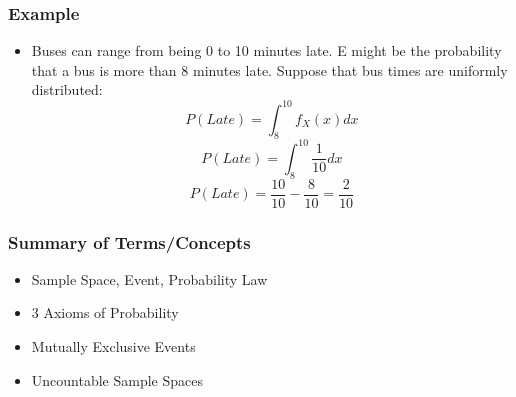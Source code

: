 \documentclass{beamer}
\numberwithin{equation}{section}
\begin{document}
\begin{frame}
\frametitle{Example} 
\begin{itemize}
\item Buses can range from being 0 to 10 minutes late.  E might be the probability that a bus is more than 8 minutes late.  Suppose that bus times are uniformly distributed:
 $$P(Late)=\int_{8}^{10} f_X(x) dx$$
 $$P(Late)=\int_{8}^{10} \frac{1}{10}dx$$
 $$P(Late)=\frac{10}{10}-\frac{8}{10}=\frac{2}{10}$$
\end{itemize}
\end{frame}



\begin{frame}
\frametitle{Summary of Terms/Concepts}
\begin{itemize}
\item Sample Space, Event, Probability Law
\item 3 Axioms of Probability 
\item Mutually Exclusive Events
\item Uncountable Sample Spaces
\end{itemize}
\end{frame}
\end{document}
